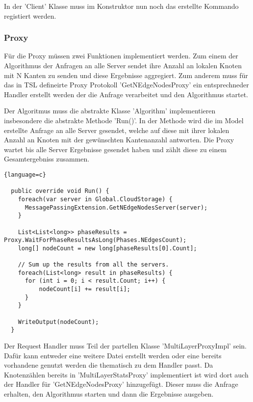 In der 'Client' Klasse muss im Konstruktor nun noch das erstellte Kommando registiert werden.

\subsubsection{Proxy}

Für die Proxy müssen zwei Funktionen implementiert werden. Zum einem der Algorithmus der Anfragen an alle Server sendet ihre Anzahl an lokalen Knoten mit N Kanten zu senden und diese Ergebnisse aggregiert. Zum anderem muss 
für das in TSL defineirte Proxy Protokoll 'GetNEdgeNodesProxy' ein entsprechneder Handler erstellt werden der die Anfrage verarbeitet und den Algorithmus startet.

Der Algoritmus muss die abstrakte Klasse 'Algorithm' implementieren insbesondere die abstrakte Methode 'Run()'. In der Methode wird die im Model erstellte Anfrage an alle Server gesendet, welche auf diese mit ihrer lokalen Anzahl an Knoten mit der gewünschten Kantenanzahl antworten. Die Proxy
wartet bis alle Server Ergebnisse gesendet haben und zählt diese zu einem Gesamtergebniss zusammen.

\begin{lstlisting}{language=c}

  public override void Run() {
    foreach(var server in Global.CloudStorage) {
      MessagePassingExtension.GetNEdgeNodesServer(server);
    }

    List<List<long>> phaseResults =  Proxy.WaitForPhaseResultsAsLong(Phases.NEdgesCount);
    long[] nodeCount = new long[phaseResults[0].Count];

    // Sum up the results from all the servers.
    foreach(List<long> result in phaseResults) {
      for (int i = 0; i < result.Count; i++) {
          nodeCount[i] += result[i];
      }
    }

    WriteOutput(nodeCount);
  }

\end{lstlisting}


Der Request Handler muss Teil der partellen Klasse 'MultiLayerProxyImpl' sein. Dafür kann entweder eine weitere Datei erstellt werden oder eine bereits vorhandene genutzt werden die thematisch zu dem Handler passt.
Da Knotenzählen bereits in 'MultiLayerStatsProxy' implementiert ist wird dort auch der Handler für 'GetNEdgeNodesProxy' hinzugefügt. Dieser muss die Anfrage erhalten, den Algorithmus starten und dann die Ergebnisse ausgeben.

